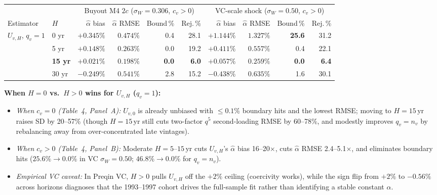\documentclass[10.5pt]{article}
\begin{document}
{\small
\begin{center}
\begin{tabular}{@{}ll rrrr rrrr@{}}
\toprule
& & \multicolumn{4}{c}{Buyout M4 $2c$ ($\sigma_W=0.306$, $c_v>0$)} & \multicolumn{4}{c}{VC-scale shock ($\sigma_W=0.50$, $c_v>0$)} \\
\cmidrule(lr){3-6}\cmidrule(lr){7-10}
Estimator & $H$ & $\hat\alpha$ bias & $\hat\alpha$ RMSE & Bound\,\% & Rej.\,\% & $\hat\alpha$ bias & $\hat\alpha$ RMSE & Bound\,\% & Rej.\,\% \\
\midrule
$U_{v,H}$, $q_v=1$ & 0 yr & $+0.345\%$ & $0.474\%$ & 0.4 & 28.1 & $+1.144\%$ & $1.327\%$ & \textbf{25.6} & 31.2 \\
 & 5 yr & $+0.148\%$ & $0.263\%$ & 0.0 & 19.2 & $+0.411\%$ & $0.557\%$ & 0.4 & 22.1 \\
 & \textbf{15 yr} & $\mathbf{+0.021\%}$ & $\mathbf{0.198\%}$ & \textbf{0.0} & \textbf{6.0} & $\mathbf{+0.057\%}$ & $\mathbf{0.259\%}$ & \textbf{0.0} & \textbf{6.4} \\
 & 30 yr & $-0.249\%$ & $0.541\%$ & 2.8 & 15.2 & $-0.438\%$ & $0.635\%$ & 1.6 & 30.1 \\
\bottomrule
\end{tabular}
\end{center}
}

\textbf{When $H=0$ vs.\ $H>0$ wins for $U_{v,H}$ ($q_v=1$):}
\begin{itemize}
  \item \emph{When $c_v=0$ (Table~4, Panel~A):} $U_{v,0}$ is already unbiased with $\le 0.1\%$ boundary hits and the lowest RMSE; moving to $H=15$\,yr raises SD by 20--57\% (though $H=15$\,yr still cuts two-factor $q^5$ second-loading RMSE by 60--78\%, and modestly improves $q_v=n_v$ by rebalancing away from over-concentrated late vintages).
  \item \emph{When $c_v>0$ (Table~4, Panel~B):} Moderate $H=5$--$15$\,yr cuts $U_{v,H}$'s $\hat\alpha$ bias 16--20$\times$, cuts $\hat\alpha$ RMSE 2.4--5.1$\times$, and eliminates boundary hits ($25.6\% \to 0.0\%$ in VC $\sigma_W=0.50$; $46.8\% \to 0.0\%$ for $q_v=n_v$).
  \item \emph{Empirical VC caveat:} In Preqin VC, $H>0$ pulls $U_{v,H}$ off the $+2\%$ ceiling (coercivity works), while the sign flip from $+2\%$ to $-0.56\%$ across horizons diagnoses that the 1993--1997 cohort drives the full-sample fit rather than identifying a stable constant $\alpha$.
\end{itemize}

\end{document}
